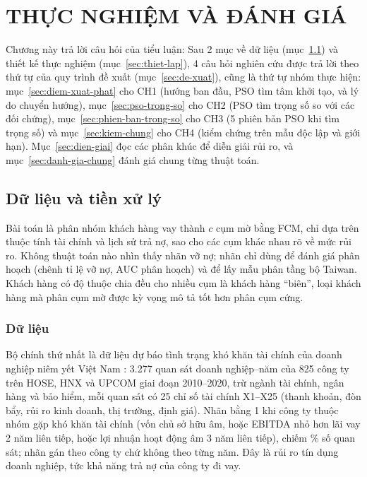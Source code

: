 \chapter{THỰC NGHIỆM VÀ ĐÁNH GIÁ}
\label{chap:thuc-nghiem}

Chương này trả lời câu hỏi của tiểu luận: \emph{\cauHoiTong} Sau 2 mục về dữ liệu (mục~\ref{sec:du-lieu}) và thiết kế
thực nghiệm (mục~\ref{sec:thiet-lap}), 4 câu hỏi nghiên cứu được trả lời theo thứ tự của quy trình đề xuất
(mục~\ref{sec:de-xuat}), cũng là thứ tự nhóm thực hiện: mục~\ref{sec:diem-xuat-phat} cho CH1 (hướng ban đầu, PSO tìm tâm
khởi tạo, và lý do chuyển hướng),
mục~\ref{sec:pso-trong-so} cho CH2 (PSO tìm trọng số so với các đối chứng), mục~\ref{sec:phien-ban-trong-so} cho CH3 (5
phiên bản PSO khi tìm trọng số) và mục~\ref{sec:kiem-chung} cho CH4 (kiểm chứng trên mẫu độc lập và giới hạn). Mục~\ref{sec:dien-giai} đọc
các phân khúc để diễn giải rủi ro, và mục~\ref{sec:danh-gia-chung} đánh giá chung từng thuật toán.

\section{Dữ liệu và tiền xử lý}
\label{sec:du-lieu}

Bài toán là phân nhóm khách hàng vay thành $c$ cụm mờ bằng FCM, chỉ dựa trên thuộc tính tài chính và lịch sử trả nợ,
sao cho các cụm khác nhau rõ về mức rủi ro. Không thuật toán nào nhìn thấy nhãn vỡ nợ; nhãn chỉ dùng để đánh giá phân hoạch
(chênh tỉ lệ vỡ nợ, AUC phân hoạch) và để lấy mẫu phân tầng bộ Taiwan. Khách hàng có độ thuộc chia đều cho nhiều cụm là
khách hàng ``biên'', loại khách hàng mà phân cụm mờ được kỳ vọng mô tả tốt hơn phân cụm cứng.

\subsection{Dữ liệu}

Bộ chính thứ nhất là dữ liệu dự báo tình trạng khó khăn tài chính của doanh nghiệp niêm yết Việt Nam \parencite{tran2022distress}: 3.277
quan sát doanh nghiệp--năm của 825 công ty trên HOSE, HNX và UPCOM giai đoạn 2010--2020, trừ ngành tài chính, ngân hàng
và bảo hiểm, mỗi quan sát có 25 chỉ số tài chính X1--X25 (thanh khoản, đòn bẩy, rủi ro kinh doanh, thị trường, định
giá). Nhãn bằng 1 khi công ty thuộc nhóm gặp khó khăn tài chính (vốn chủ sở hữu âm, hoặc EBITDA nhỏ hơn lãi vay 2 năm liên tiếp,
hoặc lợi nhuận hoạt động âm 3 năm liên tiếp), chiếm \soLieuMoTaVietNamNhanMot\% số quan sát; nhãn gán theo công ty
chứ không theo từng năm. Đây là rủi ro tín dụng doanh nghiệp, tức khả năng trả nợ của công ty đi vay.

